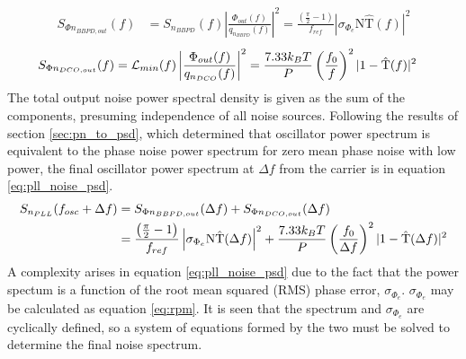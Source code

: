 		\begin{align}\label{eq:out_psd_bbpd_pll}
			S_{\Phi n_{BBPD,out}}(f) &= S_{n_{BBPD}}(f)\left|\frac{\Phi_{out}(f)}{q_{n_{BBPD}}(f)}\right|^2 = \frac{\left(\frac{\pi}{2}-1\right)}{f_{ref}}\left|\sigma_{\Phi_e}\mathrm{N}\hat{\mathrm{T}}(f)\right|^2
		\end{align}
		\begin{align}\label{eq:out_psd_dco_pll}
			S_{\Phi n_{DCO,out}}(f) &= \mathcal{L}_{min}(f)\left|\frac{\Phi_{out}(f)}{q_{n_{DCO}}(f)}\right|^2 = \frac{7.33k_BT}{P}\left(\frac{f_0}{f}\right)^2|1-\hat{\textnormal{T}}(f)|^2 
		\end{align}
		The total output noise power spectral density is given as the sum of the components, presuming independence of all noise sources. Following the results of section \ref{sec:pn_to_psd}, which determined that oscillator power spectrum is equivalent to the phase noise power spectrum for zero mean phase noise with low power, the final oscillator power spectrum at $\Delta f$ from the carrier is in equation \ref{eq:pll_noise_psd}.
		\begin{align}
			S_{n_{PLL}}(f_{osc} + \Delta f) &= S_{\Phi n_{BBPD,out}}(\Delta f) + S_{\Phi n_{DCO,out}}(\Delta f)\label{eq:pll_noise_psd}\\
			&= \frac{\left(\frac{\pi}{2}-1\right)}{f_{ref}}\left|\sigma_{\Phi_e}\mathrm{N}\hat{\mathrm{T}}(\Delta f)\right|^2 + \frac{7.33k_BT}{P}\left(\frac{f_0}{\Delta f}\right)^2|1-\hat{\textnormal{T}}({\Delta f})|^2
		\end{align}
		A complexity arises in equation \ref{eq:pll_noise_psd} due to the fact that the power spectum is a function of the root mean squared (RMS) phase error, $\sigma_{\Phi_e}$. $\sigma_{\Phi_e}$ may be calculated as equation \ref{eq:rpm}. It is seen that the spectrum and $\sigma_{\Phi_e}$ are cyclically defined, so a system of equations formed by the two must be solved to determine the final noise spectrum.

